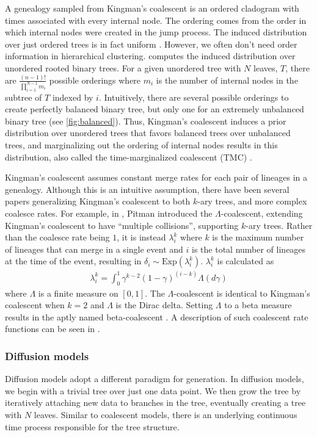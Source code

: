 \documentclass{article}
\begin{document}
A genealogy sampled from Kingman's coalescent
is an ordered cladogram with times associated with every internal node.
The ordering comes from the order in which
internal nodes were created in the jump process.
The induced distribution over just ordered trees
is in fact uniform \citep{Teh2009}.
However, we often don't need order information
in hierarchical clustering.
\citep{Boyles2012} computes the induced distribution over
unordered rooted binary trees.
For a given unordered tree with $N$ leaves, $T$,
there are $\frac{(n - 1)!}{\prod_{i = 1}^{N - 1}m_i}$ possible orderings
where $m_i$ is the number of internal nodes in the subtree
of $T$ indexed by $i$. 
Intuitively, there
are several possible orderings to create perfectly balanced binary tree,
but only one for an extremely unbalanced binary tree (see \autoref{fig:balanced}).
Thus, Kingman's coalescent induces a prior distribution
over unordered trees
that favors balanced trees over unbalanced trees,
and 
marginalizing out the ordering of internal
nodes results in this distribution, also called
the time-marginalized coalescent (TMC) \citep{Boyles2012}.

Kingman's coalescent assumes constant merge rates
for each pair of lineages in a genealogy. 
Although this is an intuitive assumption,
there have been several papers generalizing Kingman's coalescent
to both $k$-ary trees, and more complex coalesce rates.
For example, in \citep{Pitman1999}, Pitman introduced the
$\Lambda$-coalescent, extending Kingman's coalescent
to have ``multiple collisions'', supporting
$k$-ary trees.
Rather than the coalesce rate
being $1$, it is instead $\lambda_i^k$
where $k$ is the maximum number of lineages
that can merge in a single event and $i$ is the total number
of lineages at the time of the event, resulting in $\delta_i \sim \text{Exp}(\lambda_i^k)$. $\lambda_i^k$ is calculated as
\begin{align}
  \lambda_i^k = \int_0^1 \gamma^{k - 2}(1 - \gamma)^{(i-k)}\Lambda(d\gamma)
\end{align}
where $\Lambda$ is a finite measure on $[0, 1]$. The
$\Lambda$-coalescent is identical to Kingman's coalescent
when $k = 2$ and $\Lambda$ is the Dirac delta.
Setting $\Lambda$ to a beta measure
results in the aptly named beta-coalescent \citep{Hu2013}.
A description of such coalescent rate functions
can be seen in \citep{Aldous1999}.

\subsubsection*{Diffusion models}
Diffusion models adopt a different paradigm for generation.
In diffusion models, we begin with a
trivial tree over just one data point. We then
grow the tree by iteratively attaching new data
to branches in the tree, eventually creating
a tree with $N$ leaves.
Similar to coalescent models, there is an underlying
continuous time process responsible for
the tree structure.
\end{document}
